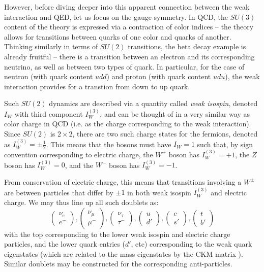 However, before diving deeper into this apparent connection between the weak interaction and QED, let us focus on the
gauge symmetry. In QCD, the $SU(3)$ content of the theory is expressed via a contraction of color indices -- the theory 
allows for transitions between quarks of one color and quarks of another. Thinking similarly in terms of $SU(2)$ transitions,
the beta decay example is already fruitful -- there is a transition between an electron and its corresponding neutrino, 
as well as between two types of quark. In particular, for the case of neutron (with quark content $udd$) and proton 
(with quark content $udu$), the weak interaction provides for a transtion from down to up quark.

Such $SU(2)$ dynamics are described via a quantity called \emph{weak isospin}, denoted $I_{W}$ with third component 
$I_{W}^{(3)}$, and can be thought of in a very similar way as color charge in QCD (i.e. as the charge corresponding to the 
weak interaction). Since $SU(2)$ is $2 \times 2$, there are two such charge states for the fermions, denoted as 
$I_{W}^{(3)}=\pm \frac{1}{2}$. This means that the bosons must have $I_{W} = 1$ such that, by sign convention corresponding 
to electric charge, the $W^{+}$ boson has $I_{W}^{(3)}=+1$, the $Z$ boson has $I_{W}^{(3)}=0$, and the $W^{-}$ boson has
$I_{W}^{(3)}=-1$.

From conservation of electric charge, this means that transitions involving a $W^{\pm}$ are between particles that differ by
$\pm 1$ in both weak isospin $I_{W}^{(3)}$ and electric charge. We may thus line up all such doublets as: 
\begin{equation}
\begin{pmatrix}\nu_{e} \\ e^{-}\end{pmatrix}, \begin{pmatrix}\nu_{\mu} \\ \mu^{-}\end{pmatrix}, 
\begin{pmatrix}\nu_{\tau} \\ \tau^{-}\end{pmatrix}, \begin{pmatrix}u \\ d'\end{pmatrix}, 
\begin{pmatrix}c \\ s'\end{pmatrix}, \begin{pmatrix}t \\ b'\end{pmatrix}
\end{equation}
with the top corresponding to the lower weak isospin and electric charge particles, and the lower quark entries 
($d'$, etc) corresponding to the weak quark eigenstates (which are related to the mass eigenstates by the CKM 
matrix ). Similar doublets may be constructed for the corresponding anti-particles.

